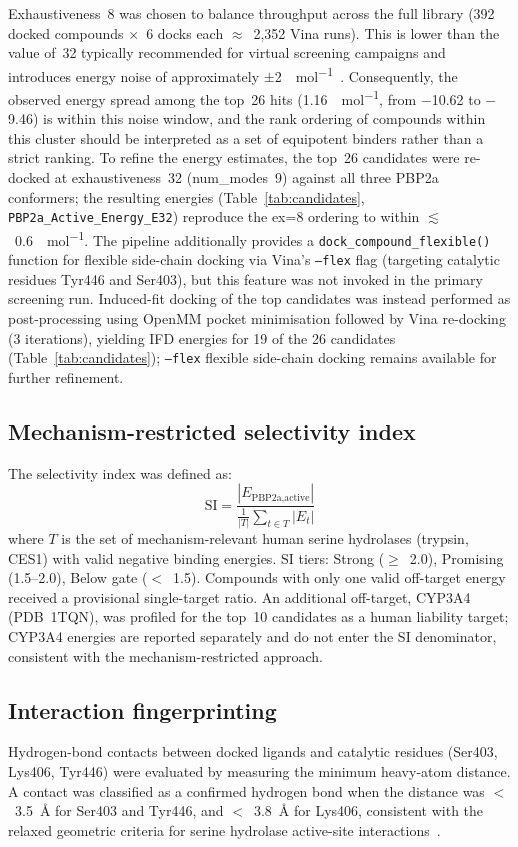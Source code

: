 \documentclass[12pt]{article}
\begin{document}
Exhaustiveness~8 was chosen to balance throughput across the full library (392 docked compounds $\times$~6 docks each $\approx$~2,352 Vina runs). This is lower than the value of~32 typically recommended for virtual screening campaigns and introduces energy noise of approximately $\pm$\SI{2}{\kcal\per\mol}~\cite{trott2010}. Consequently, the observed energy spread among the top~26 hits (1.16~\si{\kcal\per\mol}, from $-$10.62 to $-$9.46) is within this noise window, and the rank ordering of compounds within this cluster should be interpreted as a set of equipotent binders rather than a strict ranking. To refine the energy estimates, the top~26 candidates were re-docked at exhaustiveness~32 (num\_modes~9) against all three PBP2a conformers; the resulting energies (Table~\ref{tab:candidates}, \texttt{PBP2a\_Active\_Energy\_E32}) reproduce the ex=8 ordering to within $\lesssim$~0.6~\si{\kcal\per\mol}. The pipeline additionally provides a \texttt{dock\_compound\_flexible()} function for flexible side-chain docking via Vina's \texttt{--flex} flag (targeting catalytic residues Tyr446 and Ser403), but this feature was not invoked in the primary screening run. Induced-fit docking of the top candidates was instead performed as post-processing using OpenMM pocket minimisation followed by Vina re-docking (3 iterations), yielding IFD energies for 19 of the 26 candidates (Table~\ref{tab:candidates}); \texttt{--flex} flexible side-chain docking remains available for further refinement.

\subsection{Mechanism-restricted selectivity index}
The selectivity index was defined as:
\begin{equation}
\text{SI} = \frac{|E_{\text{PBP2a,active}}|}{\frac{1}{|T|}\sum_{t \in T} |E_t|}
\end{equation}
where $T$ is the set of mechanism-relevant human serine hydrolases (trypsin, CES1) with valid negative binding energies. SI tiers: Strong ($\ge$~2.0), Promising (1.5--2.0), Below gate ($<$~1.5). Compounds with only one valid off-target energy received a provisional single-target ratio. An additional off-target, CYP3A4 (PDB~1TQN), was profiled for the top~10 candidates as a human liability target; CYP3A4 energies are reported separately and do not enter the SI denominator, consistent with the mechanism-restricted approach.

\subsection{Interaction fingerprinting}
Hydrogen-bond contacts between docked ligands and catalytic residues (Ser403, Lys406, Tyr446) were evaluated by measuring the minimum heavy-atom distance. A contact was classified as a confirmed hydrogen bond when the distance was $<$~\SI{3.5}{\angstrom} for Ser403 and Tyr446, and $<$~\SI{3.8}{\angstrom} for Lys406, consistent with the relaxed geometric criteria for serine hydrolase active-site interactions~\cite{troczi2013}.
\end{document}
